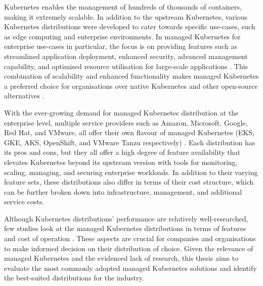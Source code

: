 Kubernetes enables the management of hundreds of thousands of containers, making it extremely scalable. In addition to the upstream Kubernetes, various Kubernetes distributions were developed to cater towards specific use-cases, such as edge computing and enterprise environments. In managed Kubernetes for enterprise use-cases in particular, the focus is on providing features such as streamlined application deployment, enhanced security, advanced management capability, and optimised resource utilisation for large-scale applications \cite{WhatEnterpriseKubernetes, truyenComprehensiveFeatureComparison2019, jiangIndustrialApplicationsDigital2021}. This combination of scalability and enhanced functionality makes managed Kubernetes a preferred choice for organisations over native Kubernetes and other open-source alternatives \cite{redhatinc.StateKubernetesSecurity2024, vrabicDigitalTwinsUnderstanding2018, portworxKubernetesAdoptionSurvey2021, broadcomStateKubernetes20232023}.

With the ever-growing demand for managed Kubernetes distribution at the enterprise level, multiple service providers such as Amazon, Microsoft, Google, Red Hat, and VMware, all offer their own flavour of managed Kubernetes (EKS, GKE, AKS, OpenShift, and VMware Tanzu respectively) \cite{AmazonEKSCustomers, maEurekaHumanLevelReward2023, nickomangAzureKubernetesService, redhatinc.RedHatOpenShift, VMwareTanzuPlatform}. Each distribution has its pros and cons, but they all offer a high degree of feature availability that elevates Kubernetes beyond its upstream version with tools for monitoring, scaling, managing, and securing enterprise workloads. In addition to their varying feature sets, these distributions also differ in terms of their cost structure, which can be further broken down into infrastructure, management, and additional service costs.

Although Kubernetes distributions' performance are relatively well-researched, few studies look at the managed Kubernetes distributions in terms of features and cost of operation \cite{bohmProfilingLightweightContainer2021, kjorveziroskiKubernetesDistributionsEdge2022, ascensaoAssessingKubernetesDistributions2024, pereiraferreiraPerformanceEvaluationContainers2019}. These aspects are crucial for companies and organisations to make informed decision on their distribution of choice. Given the relevance of managed Kubernetes and the evidenced lack of research, this thesis aims to evaluate the most commonly adopted managed Kubernetes solutions and identify the best-suited distributions for the industry.

